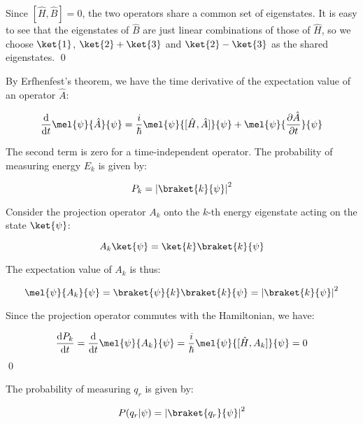 \documentclass[12pt]{article}
\begin{document}
Since $[\hat{H}, \hat{B}] = 0$, the two operators share a common set of eigenstates. It is easy to see that the eigenstates of $\hat{B}$ are just linear combinations of those of $\hat{H}$, so we choose $\ket{1}$, $\ket{2} + \ket{3}$ and $\ket{2} - \ket{3}$ as the shared eigenstates.
\qed


By Erfhenfest's theorem, we have the time derivative of the expectation value of an operator $\hat{A}$:

\begin{equation}
    \frac{\mathrm{d}}{\mathrm{d}t} \mel{\psi}{\hat{A}}{\psi} = \frac{i}{\hbar} \mel{\psi}{[\hat{H}, \hat{A}]}{\psi} + \mel{\psi}{\frac{\partial \hat{A}}{\partial t}}{\psi}
\end{equation}

The second term is zero for a time-independent operator. The probability of measuring energy $E_{k}$ is given by:

\begin{equation}
    P_{k} = \left\lvert \braket{k}{\psi} \right\rvert^{2}
\end{equation}

Consider the projection operator $A_{k}$ onto the $k$-th energy eigenstate acting on the state $\ket{\psi}$:

\begin{equation}
    A_{k} \ket{\psi} = \ket{k} \braket{k}{\psi}
\end{equation}

The expectation value of $A_{k}$ is thus:

\begin{equation}
    \mel{\psi}{A_{k}}{\psi} = \braket{\psi}{k} \braket{k}{\psi} = \left\lvert \braket{k}{\psi} \right\rvert^{2}
\end{equation}

Since the projection operator commutes with the Hamiltonian, we have:

\begin{equation}
    \frac{\mathrm{d}P_{k}}{\mathrm{d}t} = \frac{\mathrm{d}}{\mathrm{d}t} \mel{\psi}{A_{k}}{\psi} = \frac{i}{\hbar} \mel{\psi}{[\hat{H}, A_{k}]}{\psi} = 0
\end{equation}
\qed


The probability of measuring $q_{r}$ is given by:

\begin{equation}
    P(q_{r} | \psi) = \left\lvert \braket{q_{r}}{\psi} \right\rvert^{2}
\end{equation}
\end{document}
